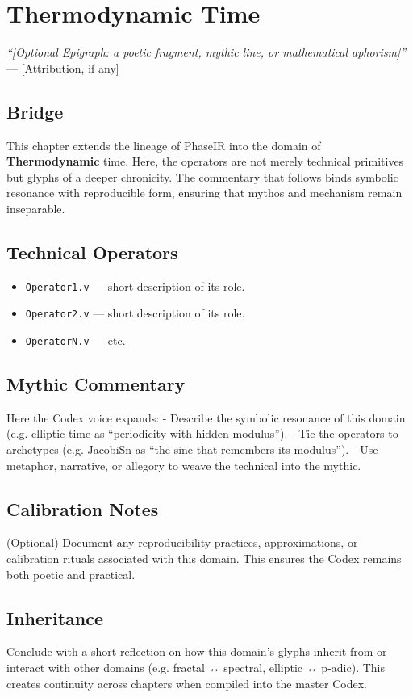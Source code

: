 \chapter{Thermodynamic Time}

\begin{flushright}
\textit{“[Optional Epigraph: a poetic fragment, mythic line, or mathematical aphorism]”} \\
— [Attribution, if any]
\end{flushright}

\section*{Bridge}
This chapter extends the lineage of PhaseIR into the domain of \textbf{Thermodynamic} time.  
Here, the operators are not merely technical primitives but glyphs of a deeper chronicity.  
The commentary that follows binds symbolic resonance with reproducible form, ensuring that  
mythos and mechanism remain inseparable.

\section{Technical Operators}
\begin{itemize}
  \item \texttt{Operator1.v} — short description of its role.
  \item \texttt{Operator2.v} — short description of its role.
  \item \texttt{OperatorN.v} — etc.
\end{itemize}

\section{Mythic Commentary}
Here the Codex voice expands:  
- Describe the symbolic resonance of this domain (e.g. elliptic time as “periodicity with hidden modulus”).  
- Tie the operators to archetypes (e.g. JacobiSn as “the sine that remembers its modulus”).  
- Use metaphor, narrative, or allegory to weave the technical into the mythic.  

\section{Calibration Notes}
(Optional) Document any reproducibility practices, approximations, or calibration rituals  
associated with this domain. This ensures the Codex remains both poetic and practical.

\section{Inheritance}
Conclude with a short reflection on how this domain’s glyphs inherit from or  
interact with other domains (e.g. fractal ↔ spectral, elliptic ↔ p-adic).  
This creates continuity across chapters when compiled into the master Codex.
